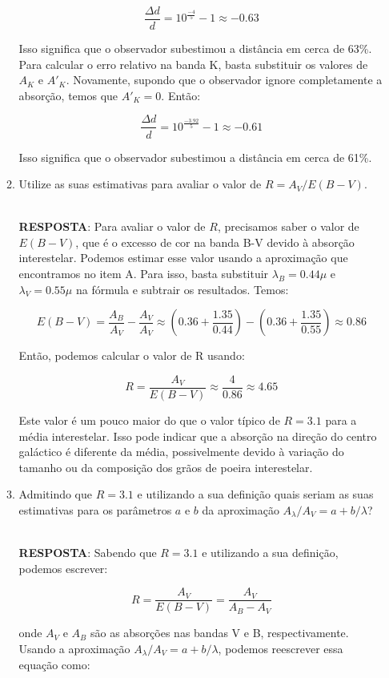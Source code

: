 \documentclass[a4paper,12pt]{article}
\begin{document}
\begin{enumerate}
\begin{enumerate}
$$\frac{\Delta d}{d} = 10^{\frac{-4}{5}} - 1 \approx -0.63$$

Isso significa que o observador subestimou a distância em cerca de 63\%. Para calcular o erro relativo na banda K, basta substituir os valores de $A_K$ e $A'_K$. Novamente, supondo que o observador ignore completamente a absorção, temos que $A'_K = 0$. Então:

$$\frac{\Delta d}{d} = 10^{\frac{-3.92}{5}} - 1 \approx -0.61$$

Isso significa que o observador subestimou a distância em cerca de 61\%.

\noindent\hrulefill

\item Utilize as suas estimativas para avaliar o valor de $R=A_V/E(B-V)$.

\noindent\hrulefill\\\textbf{RESPOSTA}: Para avaliar o valor de $R$, precisamos saber o valor de $E(B-V)$, que é o excesso de cor na banda B-V devido à absorção interestelar. Podemos estimar esse valor usando a aproximação que encontramos no item A. Para isso, basta substituir $\lambda_B = 0.44\mu$ e $\lambda_V = 0.55\mu$ na fórmula e subtrair os resultados. Temos:

$$E(B-V) = \frac{A_B}{A_V} - \frac{A_V}{A_V} \approx \left(0.36 + \frac{1.35}{0.44}\right) - \left(0.36 + \frac{1.35}{0.55}\right) \approx 0.86$$

Então, podemos calcular o valor de R usando:

$$R=\dfrac{A_V}{E(B-V)}\approx \dfrac{4}{0.86}\approx 4.65$$

Este valor é um pouco maior do que o valor típico de $R=3.1$ para a média interestelar. Isso pode indicar que a absorção na direção do centro galáctico é diferente da média, possivelmente devido à variação do tamanho ou da composição dos grãos de poeira interestelar.

\noindent\hrulefill

\item Admitindo que $R=3.1$ e utilizando a sua definição quais seriam as suas estimativas para os parâmetros $a$ e $b$ da aproximação $A_\lambda/A_V = a + b/\lambda$?

\noindent\hrulefill\\\textbf{RESPOSTA}: Sabendo que $R=3.1$ e utilizando a sua definição, podemos escrever:

$$R = \frac{A_V}{E(B-V)} = \frac{A_V}{A_B - A_V}$$

onde $A_V$ e $A_B$ são as absorções nas bandas V e B, respectivamente. Usando a aproximação $A_\lambda/A_V = a + b/\lambda$, podemos reescrever essa equação como:


\end{enumerate}
\end{enumerate}
\end{document}
